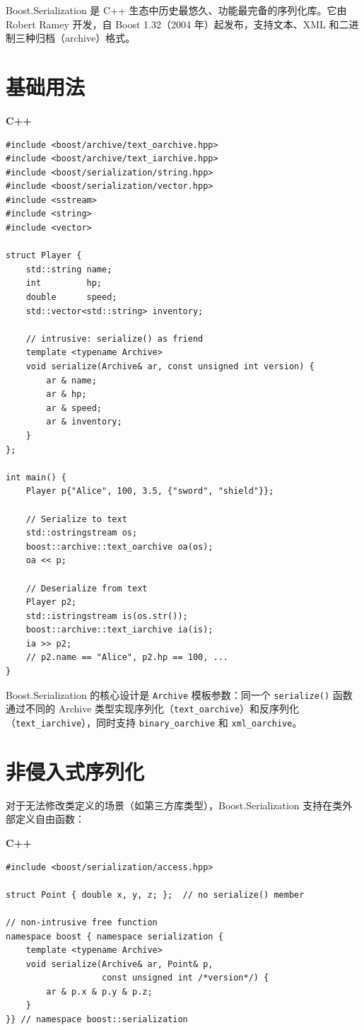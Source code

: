 \documentclass[12pt,a4paper,fontset=fandol]{ctexbook}
\newcommand{\Fn}[1]{\texttt{#1()}}
\newcommand{\Tp}[1]{\texttt{#1}}
\newcommand{\cpplabel}{%
  \noindent\begin{tcolorbox}[colback=algheadbg,coltext=white,
    sharp corners,boxrule=0pt,width=3.0em,height=1.4em,
    halign=center,valign=center,nobeforeafter,left=0pt,right=0pt,
    top=0pt,bottom=0pt]\small\bfseries C++\end{tcolorbox}}
\begin{document}
Boost.Serialization 是 C++ 生态中历史最悠久、功能最完备的序列化库。它由 Robert Ramey 开发，自 Boost 1.32（2004 年）起发布，支持文本、XML 和二进制三种归档（archive）格式。

\section{基础用法}\label{sec:boost-basic}

\cpplabel
\begin{lstlisting}[caption={Boost.Serialization: 侵入式序列化}]
#include <boost/archive/text_oarchive.hpp>
#include <boost/archive/text_iarchive.hpp>
#include <boost/serialization/string.hpp>
#include <boost/serialization/vector.hpp>
#include <sstream>
#include <string>
#include <vector>

struct Player {
    std::string name;
    int         hp;
    double      speed;
    std::vector<std::string> inventory;

    // intrusive: serialize() as friend
    template <typename Archive>
    void serialize(Archive& ar, const unsigned int version) {
        ar & name;
        ar & hp;
        ar & speed;
        ar & inventory;
    }
};

int main() {
    Player p{"Alice", 100, 3.5, {"sword", "shield"}};

    // Serialize to text
    std::ostringstream os;
    boost::archive::text_oarchive oa(os);
    oa << p;

    // Deserialize from text
    Player p2;
    std::istringstream is(os.str());
    boost::archive::text_iarchive ia(is);
    ia >> p2;
    // p2.name == "Alice", p2.hp == 100, ...
}
\end{lstlisting}

Boost.Serialization 的核心设计是 \Tp{Archive} 模板参数：同一个 \Fn{serialize} 函数通过不同的 Archive 类型实现序列化（\Tp{text\_oarchive}）和反序列化（\Tp{text\_iarchive}），同时支持 \Tp{binary\_oarchive} 和 \Tp{xml\_oarchive}。

\section{非侵入式序列化}\label{sec:boost-nonintrusive}

对于无法修改类定义的场景（如第三方库类型），Boost.Serialization 支持在类外部定义自由函数：

\cpplabel
\begin{lstlisting}[caption={Boost.Serialization: 非侵入式序列化}]
#include <boost/serialization/access.hpp>

struct Point { double x, y, z; };  // no serialize() member

// non-intrusive free function
namespace boost { namespace serialization {
    template <typename Archive>
    void serialize(Archive& ar, Point& p,
                   const unsigned int /*version*/) {
        ar & p.x & p.y & p.z;
    }
}} // namespace boost::serialization
\end{lstlisting}
\end{document}
